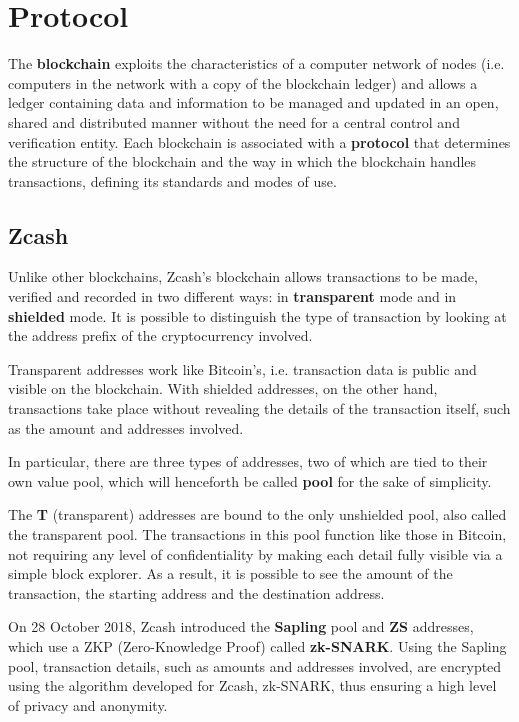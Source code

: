 \section{Protocol}

The \textbf{blockchain} exploits the characteristics of a computer network of nodes (i.e. computers in the network with a copy of the blockchain ledger) and allows a ledger containing data and information to be managed and updated in an open, shared and distributed manner without the need for a central control and verification entity. Each blockchain is associated with a \textbf{protocol} that determines the structure of the blockchain and the way in which the blockchain handles transactions, defining its standards and modes of use.

\subsection{Zcash}

\noindent Unlike other blockchains, Zcash's blockchain allows transactions to be made, verified and recorded in two different ways: in \textbf{transparent} mode and in \textbf{shielded} mode. It is possible to distinguish the type of transaction by looking at the address prefix of the cryptocurrency involved.

\noindent Transparent addresses work like Bitcoin's, i.e. transaction data is public and visible on the blockchain. With shielded addresses, on the other hand, transactions take place without revealing the details of the transaction itself, such as the amount and addresses involved. 

\noindent In particular, there are three types of addresses, two of which are tied to their own value pool, which will henceforth be called \textbf{pool} for the sake of simplicity.

\noindent The \textbf{T} (transparent) addresses are bound to the only unshielded pool, also called the transparent pool. The transactions in this pool function like those in Bitcoin, not requiring any level of confidentiality by making each detail fully visible via a simple block explorer. As a result, it is possible to see the amount of the transaction, the starting address and the destination address.

\noindent On 28 October 2018, Zcash introduced the \textbf{Sapling} pool and \textbf{ZS} addresses, which use a ZKP (Zero-Knowledge Proof) called \textbf{zk-SNARK}. Using the Sapling pool, transaction details, such as amounts and addresses involved, are encrypted using the algorithm developed for Zcash, zk-SNARK, thus ensuring a high level of privacy and anonymity.

